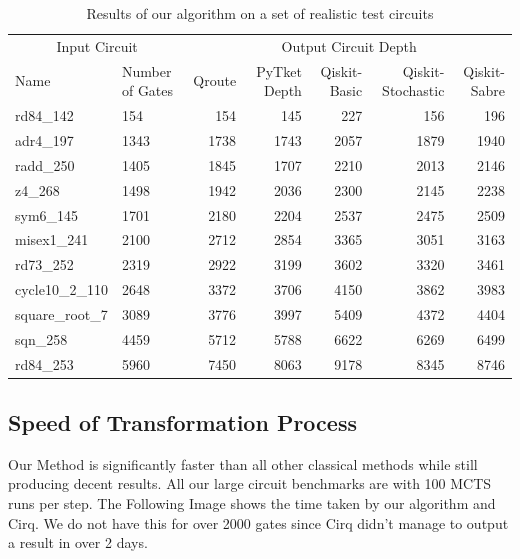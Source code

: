 \documentclass[%
 reprint,
 amsmath,amssymb,
 aps,
]{revtex4-2}
\begin{document}
\begin{table}[t]
    \caption{\label{tab:large-circuits}%
        Results of our algorithm on a set of realistic test circuits
    }
    \begin{ruledtabular}
        \begin{tabular}{ll|rrrrr}
            \multicolumn{2}{c}{\textrm{Input Circuit}} & \multicolumn{5}{c}{\textrm{Output Circuit Depth}} \\

            \textrm{Name} & \textrm{Number of Gates} & \textrm{Qroute} & \textrm{PyTket Depth} & \textrm{Qiskit-Basic} & \textrm{Qiskit-Stochastic} & \textrm{Qiskit-Sabre} \\

            \colrule
            rd84\_142 	    &  154 &  154 &  145 &  227 &  156 &  196 \\
            adr4\_197 	    & 1343 & 1738 & 1743 & 2057 & 1879 & 1940 \\
            radd\_250 	    & 1405 & 1845 & 1707 & 2210 & 2013 & 2146 \\
            z4\_268 	    & 1498 & 1942 & 2036 & 2300 & 2145 & 2238 \\
            sym6\_145 	    & 1701 & 2180 & 2204 & 2537 & 2475 & 2509 \\
            misex1\_241 	& 2100 & 2712 & 2854 & 3365 & 3051 & 3163 \\
            rd73\_252 	    & 2319 & 2922 & 3199 & 3602 & 3320 & 3461 \\
            cycle10\_2\_110 & 2648 & 3372 & 3706 & 4150 & 3862 & 3983 \\
            square\_root\_7 & 3089 & 3776 & 3997 & 5409 & 4372 & 4404 \\
            sqn\_258 	    & 4459 & 5712 & 5788 & 6622 & 6269 & 6499 \\
            rd84\_253 	    & 5960 & 7450 & 8063 & 9178 & 8345 & 8746 \\
        \end{tabular}
    \end{ruledtabular}
\end{table}

\subsection{\label{sec:results-rnd}Speed of Transformation Process}

Our Method is significantly faster than all other classical methods while still producing decent results. All our large circuit benchmarks are with 100 MCTS runs per step. The Following Image shows the time taken by our algorithm and Cirq. We do not have this for over 2000 gates since Cirq didn't manage to output a result in over 2 days.
\end{document}
